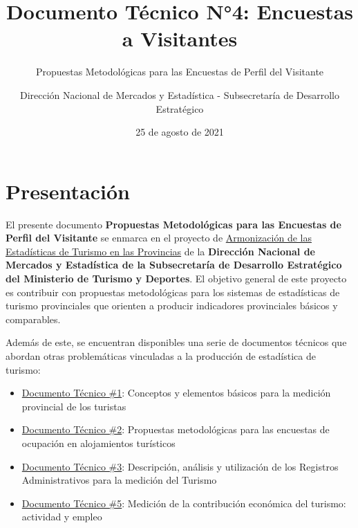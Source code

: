 \documentclass[
]{book}
\title{Documento Técnico N°4: Encuestas a Visitantes}
\subtitle{Propuestas Metodológicas para las Encuestas de Perfil del Visitante}
\author{Dirección Nacional de Mercados y Estadística - Subsecretaría de Desarrollo Estratégico}
\date{25 de agosto de 2021}
\let\oldmaketitle\maketitle
\begin{document}
\maketitle


\newpage

\let\maketitle\oldmaketitle
\maketitle

{
\setcounter{tocdepth}{1}
\tableofcontents
}
\hypertarget{presentaciuxf3n}{%
\chapter*{\texorpdfstring{\textbf{Presentación}}{Presentación}}\label{presentaciuxf3n}}

El presente documento \textbf{Propuestas Metodológicas para las Encuestas de Perfil del Visitante} se enmarca en el proyecto de \href{https://armonizacion.yvera.tur.ar//}{Armonización de las Estadísticas de Turismo en las Provincias} de la \textbf{Dirección Nacional de Mercados y Estadística de la Subsecretaría de Desarrollo Estratégico del Ministerio de Turismo y Deportes}. El objetivo general de este proyecto es contribuir con propuestas metodológicas para los sistemas de estadísticas de turismo provinciales que orienten a producir indicadores provinciales básicos y comparables.

Además de este, se encuentran disponibles una serie de documentos técnicos que abordan otras problemáticas vinculadas a la producción de estadística de turismo:

\begin{itemize}
\item
  \href{https://dnme-minturdep.github.io/DT1_medicion_turismo/}{Documento Técnico \#1}: Conceptos y elementos básicos para la medición provincial de los turistas
\item
  \href{https://dnme-minturdep.github.io/DT2_encuestas/}{Documento Técnico \#2}: Propuestas metodológicas para las encuestas de ocupación en alojamientos turísticos
\item
  \href{https://dnme-minturdep.github.io/DT3_registros_adminsitrativos/}{Documento Técnico \#3}: Descripción, análisis y utilización de los Registros Administrativos para la medición del Turismo
\item
  \href{https://dnme-minturdep.github.io/DT5_actividad_empleo/}{Documento Técnico \#5}: Medición de la contribución económica del turismo: actividad y empleo
\end{itemize}
\end{document}
